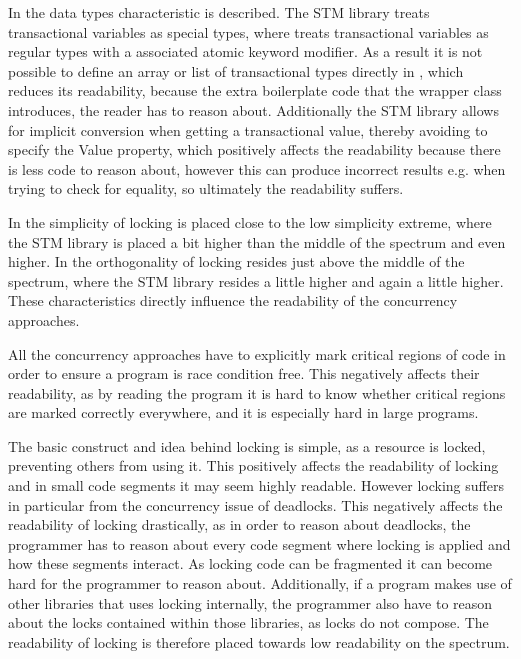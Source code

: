 In  the data types characteristic is described. The \ac{STM} library treats transactional variables as special types, where \stmname treats transactional variables as regular types with a associated atomic keyword modifier. As a result it is not possible to define an array or list of transactional types directly in \stmname, which reduces its readability, because the extra boilerplate code that the wrapper class introduces, the reader has to reason about. Additionally the \ac{STM} library allows for implicit conversion when getting a transactional value, thereby avoiding to specify the Value property, which positively affects the readability because there is less code to reason about, however this can produce incorrect results e.g. when trying to check for equality, so ultimately the readability suffers.

In  the simplicity of locking is placed close to the low simplicity extreme, where the \ac{STM} library is placed a bit higher than the middle of the spectrum and \stmname even higher. In  the orthogonality of locking resides just above the middle of the spectrum, where the \ac{STM} library resides a little higher and \stmname again a little higher. These characteristics directly influence the readability of the concurrency approaches.

All the concurrency approaches have to explicitly mark critical regions of code in order to ensure a program is race condition free. This negatively affects their readability, as by reading the program it is hard to know whether critical regions are marked correctly everywhere, and it is especially hard in large programs.

The basic  construct and idea behind locking is simple, as a resource is locked, preventing others from using it. This positively affects the readability of locking and in small code segments it may seem highly readable. However locking suffers in particular from the concurrency issue of deadlocks. This negatively affects the readability of locking drastically, as in order to reason about deadlocks, the programmer has to reason about every code segment where locking is applied and how these segments interact. As locking code can be fragmented it can become hard for the programmer to reason about. Additionally, if a program makes use of other libraries that uses locking internally, the programmer also have to reason about the locks contained within those libraries, as locks do not compose. The readability of locking is therefore placed towards low readability on the spectrum.

